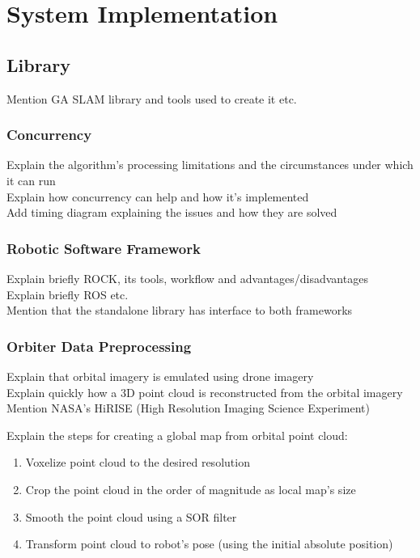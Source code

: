 \label{Chapter3}

\chapter{System Implementation}

\section{Library}

Mention GA SLAM library and tools used to create it etc.

\subsection{Concurrency}

Explain the algorithm's processing limitations and the circumstances under which it can run\\
Explain how concurrency can help and how it's implemented\\
Add timing diagram explaining the issues and how they are solved

\subsection{Robotic Software Framework}

Explain briefly ROCK, its tools, workflow and advantages/disadvantages\\
Explain briefly ROS etc.\\
Mention that the standalone library has interface to both frameworks

\subsection{Orbiter Data Preprocessing}

Explain that orbital imagery is emulated using drone imagery\\
Explain quickly how a 3D point cloud is reconstructed from the orbital imagery\\
Mention NASA's HiRISE (High Resolution Imaging Science Experiment)

\bigskip
\noindent
Explain the steps for creating a global map from orbital point cloud:
\begin{enumerate}
    \item  Voxelize point cloud to the desired resolution
    \item Crop the point cloud in the order of magnitude as local map's size
    \item Smooth the point cloud using a SOR filter
    \item Transform point cloud to robot's pose (using the initial absolute position)
\end{enumerate}

